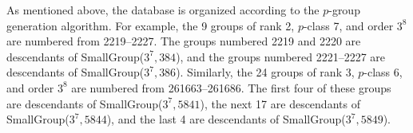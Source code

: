 
As mentioned above, the database is organized according to the $p$-group
generation algorithm. For example, the 9 groups of rank 2, $p$-class 7, and
order $3^{8}$ are numbered from 2219--2227. The groups numbered 2219 and
2220 are descendants of SmallGroup($3^{7},384$), and the groups numbered
2221--2227 are descendants of SmallGroup($3^{7},386$). Similarly, the 24
groups of rank 3, $p$-class 6, and order $3^{8}$ are numbered from
261663--261686. The first four of these groups are descendants of 
SmallGroup($3^{7},5841$), the next 17 are descendants of 
SmallGroup($3^{7},5844$), and the last 4 are descendants of 
SmallGroup($3^{7},5849$).


